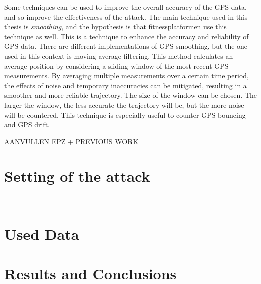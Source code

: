 \documentclass[conference]{IEEEtran}
\begin{document}
Some techniques can be used to improve the overall accuracy of the GPS data,
and so improve the effectiveness of the attack. The main technique used in this
thesis is \textit{smoothing}, and the hypothesis is that fitnessplatformen use
this technique as well. This is a technique to enhance the accuracy and
reliability of GPS data. There are different implementations of GPS smoothing,
but the one used in this context is moving average filtering. This method
calculates an average position by considering a sliding window of the most
recent GPS measurements. By averaging multiple measurements over a certain time
period, the effects of noise and temporary inaccuracies can be mitigated,
resulting in a smoother and more reliable trajectory. The size of the window
can be chosen. The larger the window, the less accurate the trajectory will be,
but the more noise will be countered. This technique is especially useful to
counter GPS bouncing and GPS drift.

AANVULLEN EPZ + PREVIOUS WORK
\section{\textbf{Setting of the attack}}\

\section{\textbf{Used Data}}

\section{\textbf{Results and Conclusions}}



\end{document}
